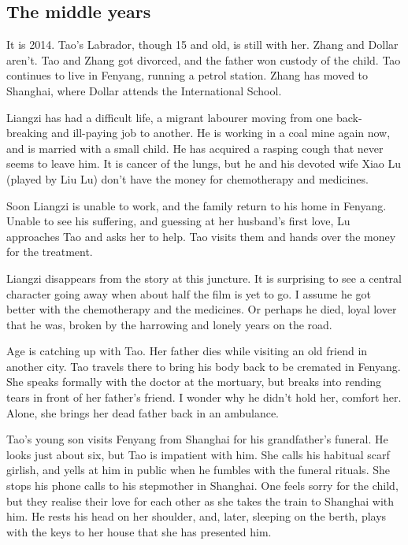 \documentclass{article}
\begin{document}
\subsection{The middle years}
\label{sec:m1ubz2fo}

It is 2014.  Tao's Labrador, though 15 and old, is still with her.
Zhang and Dollar aren't.  Tao and Zhang got divorced, and the father
won custody of the child.  Tao continues to live in Fenyang, running a
petrol station.  Zhang has moved to Shanghai, where Dollar attends the
International School.

Liangzi has had a difficult life, a migrant labourer moving from one
back-breaking and ill-paying job to another.  He is working in a coal
mine again now, and is married with a small child.  He has acquired a
rasping cough that never seems to leave him.  It is cancer of the
lungs, but he and his devoted wife Xiao Lu (played by Liu Lu) don't
have the money for chemotherapy and medicines.

Soon Liangzi is unable to work, and the family return to his home in
Fenyang.  Unable to see his suffering, and guessing at her husband's
first love, Lu approaches Tao and asks her to help.  Tao visits them
and hands over the money for the treatment.

Liangzi disappears from the story at this juncture.  It is surprising
to see a central character going away when about half the film is yet
to go.  I assume he got better with the chemotherapy and the
medicines.  Or perhaps he died, loyal lover that he was, broken by the
harrowing and lonely years on the road.

Age is catching up with Tao.  Her father dies while visiting an old
friend in another city.  Tao travels there to bring his body back to
be cremated in Fenyang.  She speaks formally with the doctor at the
mortuary, but breaks into rending tears in front of her father's
friend.  I wonder why he didn't hold her, comfort her.  Alone, she
brings her dead father back in an ambulance.

Tao's young son visits Fenyang from Shanghai for his grandfather's
funeral.  He looks just about six, but Tao is impatient with him.  She
calls his habitual scarf girlish, and yells at him in public when he
fumbles with the funeral rituals.  She stops his phone calls to his
stepmother in Shanghai.  One feels sorry for the child, but they
realise their love for each other as she takes the train to Shanghai
with him.  He rests his head on her shoulder, and, later, sleeping on
the berth, plays with the keys to her house that she has presented
him.
\end{document}
